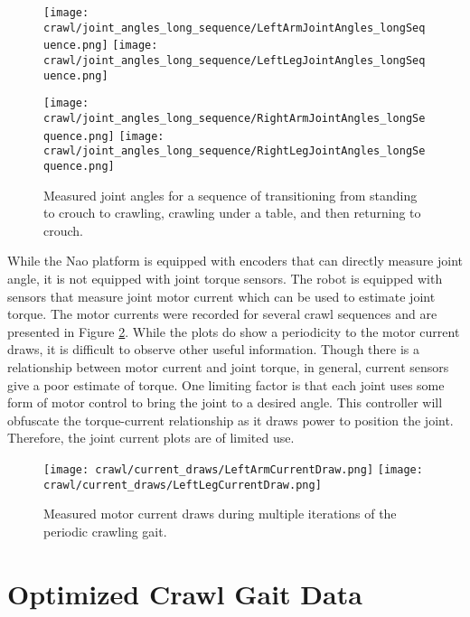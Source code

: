 \begin{figure}
  \centerline{
    \texttt{[image: crawl/joint\_angles\_long\_sequence/LeftArmJointAngles\_longSequence.png]}
    \texttt{[image: crawl/joint\_angles\_long\_sequence/LeftLegJointAngles\_longSequence.png]}
  }
  \centerline{
    \texttt{[image: crawl/joint\_angles\_long\_sequence/RightArmJointAngles\_longSequence.png]}
    \texttt{[image: crawl/joint\_angles\_long\_sequence/RightLegJointAngles\_longSequence.png]}
  }
  \caption{Measured joint angles for a sequence of transitioning from standing to crouch to crawling,
           crawling under a table, and then returning to crouch.}
  \label{fig:nao_joint_angles_long_seq}
\end{figure}

While the Nao platform is equipped with encoders that can directly measure joint
angle, it is not equipped with joint torque sensors. The robot is equipped with sensors
that measure joint motor current which can be used to estimate joint torque. The motor currents
were recorded for several crawl sequences and are presented in Figure \ref{fig:nao_currents}.
While the plots do show a periodicity to the motor current draws, it is difficult to observe
other useful information. Though there is a relationship between motor current and joint torque, 
in general, current sensors give a poor estimate of torque. One limiting factor is that each joint uses
some form of motor control to bring the joint to a desired angle. This controller will
obfuscate the torque-current relationship as it draws power to position the joint.
Therefore, the joint current plots are of limited use.

\begin{figure}
  \centerline{
    \texttt{[image: crawl/current\_draws/LeftArmCurrentDraw.png]}
    \texttt{[image: crawl/current\_draws/LeftLegCurrentDraw.png]}
  }
  \caption{Measured motor current draws during multiple iterations of the periodic crawling gait.}
  \label{fig:nao_currents}
\end{figure}




\FloatBarrier
\section{Optimized Crawl Gait Data} \label{sec:opt_crawl_data}

